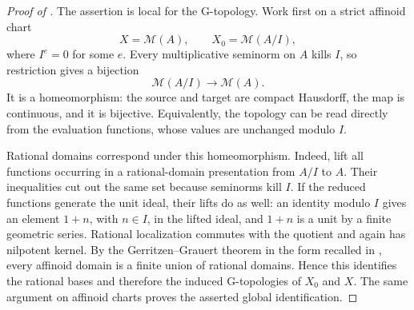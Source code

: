 
\begin{proof}[Proof of ]
The assertion is local for the G-topology.  Work first on a strict affinoid
chart
\[
                  X=\mathcal M(A),\qquad
                  X_0=\mathcal M(A/I),
\]
where \(I^e=0\) for some \(e\).  Every multiplicative seminorm on \(A\)
kills \(I\), so restriction gives a bijection
\[
                         \mathcal M(A/I)\longrightarrow\mathcal M(A).
\]
It is a homeomorphism: the source and target are compact Hausdorff, the map
is continuous, and it is bijective.  Equivalently, the topology can be
read directly from the evaluation functions, whose values are unchanged
modulo \(I\).

Rational domains correspond under this homeomorphism.  Indeed, lift all
functions occurring in a rational-domain presentation from \(A/I\) to
\(A\).  Their inequalities cut out the same set because seminorms kill
\(I\).  If the reduced functions generate the unit ideal, their lifts do
as well: an identity modulo \(I\) gives an element \(1+n\), with
\(n\in I\), in the lifted ideal, and \(1+n\) is a unit by a finite
geometric series.  Rational localization commutes with the quotient and
again has nilpotent kernel.  By the Gerritzen--Grauert theorem in the form
recalled in \cite[\S11.1.6]{CLD25}, every affinoid domain is a finite union
of rational domains.  Hence this identifies the rational bases and
therefore the induced G-topologies of \(X_0\) and \(X\).  The same argument
on affinoid charts proves the asserted global identification.


\end{proof}
